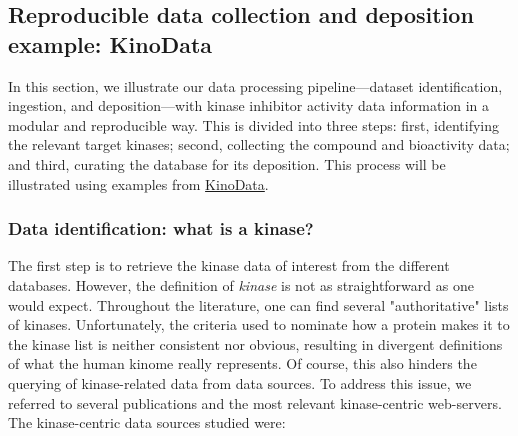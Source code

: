 \documentclass[9pt,lessons]{livecoms}
\begin{document}
\subsection{Reproducible data collection and deposition example: KinoData}

In this section, we illustrate our data processing pipeline---dataset identification, ingestion, and deposition---with kinase inhibitor activity data information in a modular and reproducible way. 
This is divided into three steps: first, identifying the relevant target kinases; second, collecting the compound and bioactivity data; and third, curating the database for its deposition. 
This process will be illustrated using examples from \href{https://github.com/openkinome/kinodata/}{KinoData}. 

\subsubsection{Data identification: what is a kinase?}
The first step is to retrieve the kinase data of interest from the different databases.
However, the definition of \textit{kinase} is not as straightforward as one would expect. 
Throughout the literature, one can find several "authoritative" lists of kinases. 
Unfortunately, the criteria used to nominate how a protein makes it to the kinase list is neither consistent nor obvious, resulting in divergent definitions of what the human kinome really represents. Of course, this also hinders the querying of kinase-related data from data sources. 
To address this issue, we referred to several publications and the most relevant kinase-centric web-servers.
The kinase-centric data sources studied were: 
\end{document}

